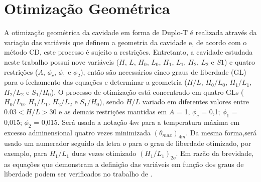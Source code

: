 \documentclass[12pt,A4,A4pt]{article}
\begin{document}
\section{Otimização Geométrica}
\label{opt}
\hspace{0.5cm}A otimização geométrica da cavidade em forma de Duplo-T é realizada através da variação das variáveis que definem a geometria da cavidade e, de acordo com o método CD, este processo é sujeito a restrições. Entretanto, a cavidade estudada neste trabalho possui nove variáveis ($H$, $L$, $H_{0}$, $L_{0}$, $H_{1}$, $L_{1}$, $H_{2}$, $L_{2}$ e $S1$) e quatro restrições ($A$, $\phi_{c}$, $\phi_{1}$ e $\phi_{2}$), então são necessários cinco graus de liberdade (GL) para o fechamento das equações e determinar a geometria ($H/L$, $H_{0}/L_{0}$, $H_{1}/L_{1}$, $H_{2}/L_{2}$ e $S_{1}/H_{0}$). O processo de otimização está concentrado em quatro GLs ( $H_{0}/L_{0}$, $H_{1}/L_{1}$, $H_{2}/L_{2}$ e $S_{1}/H_{0}$), sendo $H/L$ variado em diferentes valores entre $0.03< H/L >30$ e as demais restrições mantidas em $A$ = 1, $\phi_{c}$ = 0,1; $\phi_{1}$ = 0,015; $\phi_{2}$ = 0,015. Será usada a notação $4m$ para a temperatura máxima em excesso adminensional quatro vezes minimizada $(\theta _{max})_{4m}$. Da mesma forma,será usado um numerador seguido da letra $o$ para o grau de liberdade otimizado, por exemplo, para $H_{1}/L_{1}$ duas vezes otimizado $(H_{1}/L_{1})_{2o}$. Em razão da brevidade, as equações que demonstram a definição das variáveis em função dos graus de liberdade podem ser verificados no trabalho de .


\end{document}
